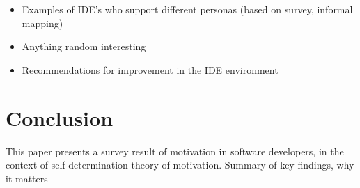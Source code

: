 \documentclass[conference]{IEEEtran}
\begin{document}
\begin{itemize}
\item
  Examples of IDE's who support different personas (based on survey,
  informal mapping)
\item
  Anything random interesting
\item
  Recommendations for improvement in the IDE environment
\end{itemize}

\section{Conclusion}

This paper presents a survey result of motivation in software
developers, in the context of self determination theory of motivation.
Summary of key findings, why it matters






%


\end{document}
